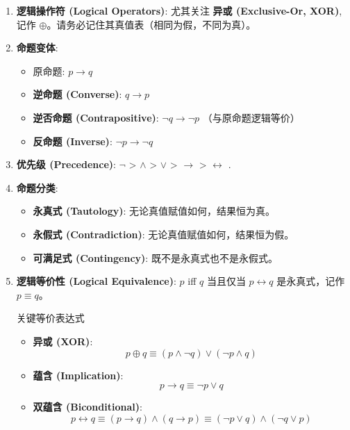 \documentclass[a4paper,12pt]{ctexart}
\begin{document}
\begin{enumerate}
    \item \textbf{逻辑操作符 (Logical Operators)}: 尤其关注 \textbf{异或 (Exclusive-Or, XOR)}, 记作 $\oplus$。请务必记住其真值表（相同为假，不同为真）。
    
    \item \textbf{命题变体}:
    \begin{itemize}
        \item 原命题: $p \to q$
        \item \textbf{逆命题 (Converse)}: $q \to p$
        \item \textbf{逆否命题 (Contrapositive)}: $\neg q \to \neg p$ （与原命题逻辑等价）
        \item \textbf{反命题 (Inverse)}: $\neg p \to \neg q$
    \end{itemize}

    \item \textbf{优先级 (Precedence)}: $\neg$  > $\land$  > $\lor$ > $\to$  > $\leftrightarrow$ .

    \item \textbf{命题分类}:
    \begin{itemize}
        \item \textbf{永真式 (Tautology)}: 无论真值赋值如何，结果恒为真。
        \item \textbf{永假式 (Contradiction)}: 无论真值赋值如何，结果恒为假。
        \item \textbf{可满足式 (Contingency)}: 既不是永真式也不是永假式。
    \end{itemize}

    \item \textbf{逻辑等价性 (Logical Equivalence)}: $p$ iff $q$ 当且仅当 $p \leftrightarrow q$ 是永真式，记作 $p \equiv q$。

    \begin{myprop}{关键等价表达式}{}
    \begin{itemize}
        \item \textbf{异或 (XOR)}:
        $$p \oplus q \equiv (p \land \neg q) \lor (\neg p \land q)$$
        \item \textbf{蕴含 (Implication)}:
        $$p \to q \equiv \neg p \lor q$$
        \item \textbf{双蕴含 (Biconditional)}:
        $$p \leftrightarrow q \equiv (p \to q) \land (q \to p) \equiv (\neg p \lor q) \land (\neg q \lor p)$$
    \end{itemize}
    \end{myprop}


\end{enumerate}
\end{document}
